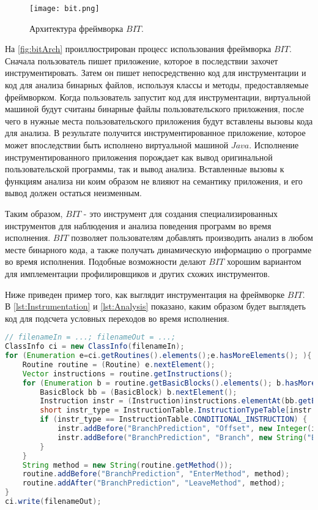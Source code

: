 \begin{figure}[h]
\centering
\texttt{[image: bit.png]}
\caption{Архитектура фреймворка $BIT$.}
\label{fig:bitArch}
\end{figure}

На \autoref{fig:bitArch} проиллюстрирован процесс использования фреймворка $BIT$. Сначала пользователь пишет приложение, которое в последствии захочет инструментировать. Затем он пишет непосредственно код для инструментации и код для анализа бинарных файлов, используя классы и методы, предоставляемые фреймворком. Когда пользователь запустит код для инструментации, виртуальной машиной будут считаны бинарные файлы пользовательского приложения, после чего в нужные места пользовательского приложения будут вставлены вызовы кода для анализа. В результате получится инструментированное приложение, которое может впоследствии быть исполнено виртуальной машиной $Java$. Исполнение инструментированного приложения порождает как вывод оригинальной пользовательской программы, так и вывод анализа. Вставленные вызовы к функциям анализа ни коим образом не влияют на семантику приложения, и его вывод должен остаться неизменным.

Таким образом, $BIT$ - это инструмент для создания специализированных инструментов для наблюдения и анализа поведения программ во время исполнения. $BIT$ позволяет пользователям добавлять производить анализ в любом месте бинарного кода, а также получать динамическую информацию о программе во время исполнения. Подобные возможности делают $BIT$ хорошим вариантом для имплементации профилировщиков и других схожих инструментов.

Ниже приведен пример того, как выглядит инструментация на фреймворке $BIT$. В \autoref{lst:Instrumentation} и \autoref{lst:Analysis} показано, каким образом будет выглядеть код для подсчета условных переходов во время исполнения.

\begin{lstlisting}[language=Java, caption=Подсчет условных переходов на $BIT$. Код инструментации, label=lst:Instrumentation]
// filenameIn = ...; filenameOut = ...;
ClassInfo ci = new ClassInfo(filenameIn);
for (Enumeration e=ci.getRoutines().elements();e.hasMoreElements(); ){
    Routine routine = (Routine) e.nextElement();
    Vector instructions = routine.getInstructions();
    for (Enumeration b = routine.getBasicBlocks().elements(); b.hasMoreElements(); ) {
        BasicBlock bb = (BasicBlock) b.nextElement();
        Instruction instr = (Instruction)instructions.elementAt(bb.getEndAddress());
        short instr_type = InstructionTable.InstructionTypeTable[instr.getOpcode()];
        if (instr_type == InstructionTable.CONDITIONAL_INSTRUCTION) {
            instr.addBefore("BranchPrediction", "Offset", new Integer(instr.getOrigOffset()));
            instr.addBefore("BranchPrediction", "Branch", new String("BranchOutcome"));
        }
    }
    String method = new String(routine.getMethod());
    routine.addBefore("BranchPrediction", "EnterMethod", method);
    routine.addAfter("BranchPrediction", "LeaveMethod", method);
}
ci.write(filenameOut);
\end{lstlisting}

